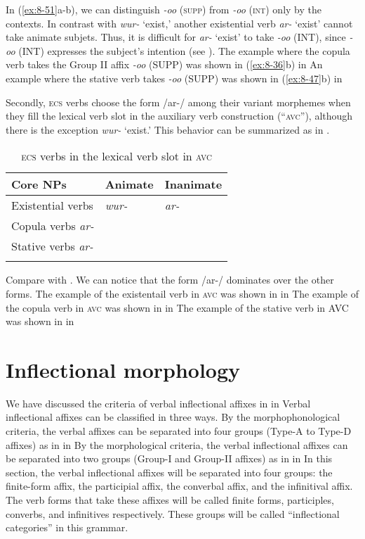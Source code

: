 In (\ref{ex:8-51}a-b), we can distinguish \textit{-oo} (\textsc{supp}) from \textit{-oo} (\textsc{int}) only by the contexts. In contrast with \textit{wur-} ‘exist,’ another existential verb \textit{ar-} ‘exist’ cannot take animate subjets. Thus, it is difficult for \textit{ar-} ‘exist’ to take \textit{-oo} (INT), since \textit{-oo} (INT) expresses the subject’s intention (see ). The example where the copula verb takes the Group II affix \textit{-oo} (SUPP) was shown in (\ref{ex:8-36}b) in  An example where the stative verb takes \textit{-oo} (SUPP) was shown in (\ref{ex:8-47}b) in 

  Secondly, \textsc{ecs} verbs choose the form /ar-/ among their variant morphemes when they fill the lexical verb slot in the auxiliary verb construction (“\textsc{avc}”), although there is the exception \textit{wur-} ‘exist.’ This behavior can be summarized as in .

\begin{table}
\caption{\label{tab:key:76}\textsc{ecs} verbs in the lexical verb slot in \textsc{avc}}

\begin{tabular}{lll}
\lsptoprule
Core NPs  & Animate  & Inanimate\\
 \midrule
Existential verbs  & \textit{wur-}  & \textit{ar-}\\
Copula verbs   \textit{ar-}\\
Stative verbs  \textit{ar-}    \\
\lspbottomrule
\end{tabular}
\end{table}

Compare  with . We can notice that the form /ar-/ dominates over the other forms. The example of the existentail verb in \textsc{avc} was shown in  in  The example of the copula verb in \textsc{avc} was shown in  in  The example of the stative verb in AVC was shown in  in 

\section{Inflectional morphology}

We have discussed the criteria of verbal inflectional affixes in  in  Verbal inflectional affixes can be classified in three ways. By the morphophonological criteria, the verbal affixes can be separated into four groups (Type-A to Type-D affixes) as in  in  By the morphological criteria, the verbal inflectional affixes can be separated into two groups (Group-I and Group-II affixes) as in  in  In this section, the verbal inflectional affixes will be separated into four groups: the finite-form affix, the participial affix, the converbal affix, and the infinitival affix. The verb forms that take these affixes will be called finite forms, participles, converbs, and infinitives respectively. These groups will be called “inflectional categories” in this grammar.

